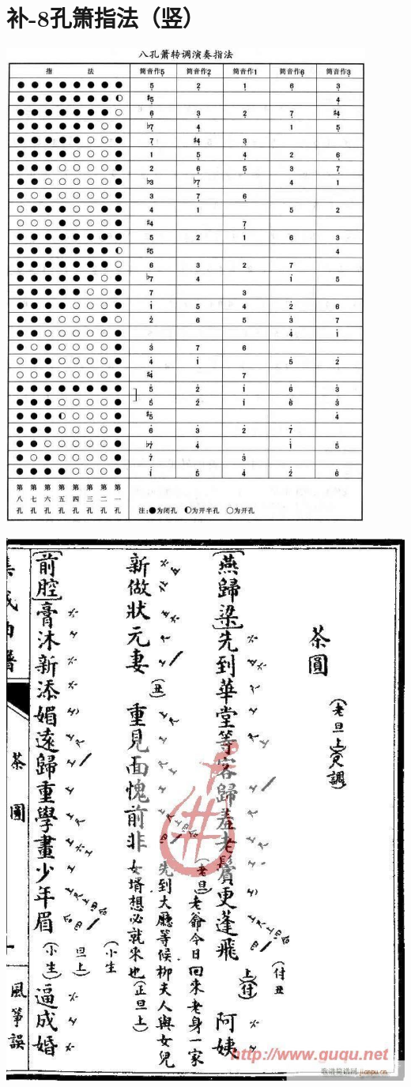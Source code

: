 \documentclass[cn,pad,twocol]{elegantbook}
\begin{document}
\section{补-8孔箫指法（竖）}    \includegraphics[width=0.9\textwidth]{dongxiao/20200817-8孔箫指法-竖}

\newpage
\pagestyle{empty}
\includegraphics[width=\textwidth]{cover99}
\end{document}
